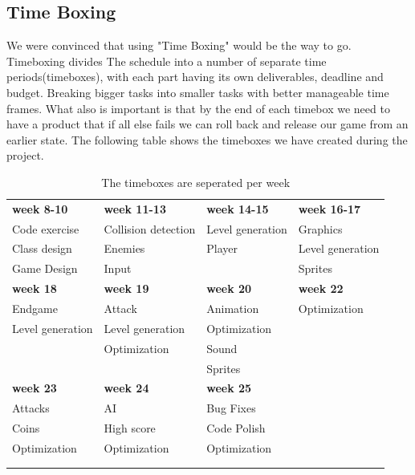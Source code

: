 \subsection{Time Boxing} %
We were convinced that using "Time Boxing" would be the way to go. Timeboxing divides The schedule into a number of separate time periods(timeboxes), with each part having its own deliverables, deadline and budget. Breaking bigger tasks into smaller tasks with better manageable time frames. What also is important is that by the end of each timebox we need to have a product that if all else fails we can roll back and release our game from an earlier state. The following table shows the timeboxes we have created during the project.
\begin{table}[h]
\begin{tabular}{llll}
  \rowcolor[HTML]{BBDAFF}
  \textbf{week 8-10}	& \textbf{week 11-13}	& \textbf{week 14-15}	& \textbf{week 16-17}	\\
  Code exercise			& Collision detection	& Level generation		& Graphics				\\
  Class design			& Enemies				& Player				& Level generation		\\
  Game Design			& Input					& 						& Sprites				\\
  \rowcolor[HTML]{BBDAFF} 
  \textbf{week 18}		& \textbf{week 19}		& \textbf{week 20}		& \textbf{week 22}		\\
  Endgame				& Attack				& Animation				& Optimization			\\
  Level generation		& Level generation		& Optimization			& 						\\
  						& Optimization			& Sound					& 						\\
  						& 						& Sprites 				& 						\\
  \textbf{week 23}		& \textbf{week 24}		& \textbf{week 25}		& 						\\
  Attacks				& AI					& Bug Fixes				& 						\\
  Coins					& High score			& Code Polish			& 						\\
  Optimization			& Optimization			& Optimization			& 						\\
  						& 						& 						& 						\\
  						& 						& 						& 						\\
\end{tabular}
\caption{The timeboxes are seperated per week}
\end{table}
\newpage

